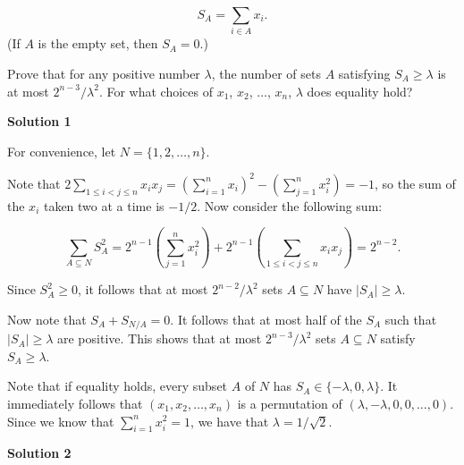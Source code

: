 \begin{enumerate}
 \[S_A = \sum_{i \in A} x_i.\]
(If $A$ is the empty set, then $S_A = 0$.)


 Prove that for any positive number $\lambda$, the number of sets $A$ satisfying $S_A \ge \lambda$ is at most $2^{n - 3}/\lambda^2$.  For what choices of $x_1$, $x_2$, $\dots$, $x_n$, $\lambda$ does equality hold?


 



\textbf{Solution 1}

For convenience, let $N=\{1,2,\dots,n\}$.

 Note that $2\sum_{1\leq i<j\leq n} x_ix_j=\left(\sum_{i=1}^{n}x_i\right)^2-\left(\sum_{j=1}^{n} x_i^2\right)=-1$, so the sum of the $x_i$ taken two at a time is $-1/2$. Now consider the following sum:

 
 \[\sum_{A\subseteq N}S_A^2=2^{n-1}\left(\sum_{j=1}^{n} x_i^2\right)+2^{n-1}\left(\sum_{1\leq i<j\leq n} x_ix_j\right)=2^{n-2}.\]

 Since $S_A^2\geq 0$, it follows that at most $2^{n-2}/\lambda^2$ sets $A\subseteq N$ have $|S_A|\geq \lambda$.

 Now note that $S_A+S_{N/A}=0$. It follows that at most half of the $S_A$ such that $|S_A|\geq\lambda$ are positive. This shows that at most $2^{n-3}/\lambda^2$ sets $A\subseteq N$ satisfy $S_A\geq \lambda$.

 Note that if equality holds, every subset $A$ of $N$ has $S_A\in\{-\lambda,0,\lambda\}$. It immediately follows that $(x_1,x_2,\ldots , x_n)$ is a permutation of $(\lambda,-\lambda,0,0,\ldots , 0)$. Since we know that $\sum_{i=1}^{n} x_i^2=1$, we have that $\lambda=1/\sqrt{2}$.

 



\textbf{Solution 2}


\end{enumerate}
